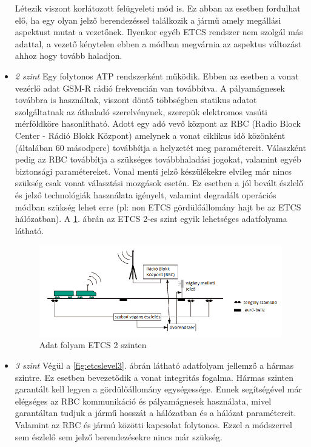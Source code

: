 \documentclass[a4paper,12pt]{article}
\begin{document}
\begin{itemize}
	Létezik viszont korlátozott felügyeleti mód is. Ez abban az esetben fordulhat elő, ha egy olyan jelző berendezéssel találkozik a jármű amely megállási aspektust mutat a vezetőnek.
	Ilyenkor egyéb ETCS rendszer nem szolgál más adattal, a vezető kénytelen ebben a módban megvárnia az aspektus változást ahhoz hogy tovább haladjon.
	
	\item \textit{2 szint} Egy folytonos ATP rendszerként működik. Ebben az esetben a vonat vezérlő adat GSM-R rádió frekvencián van továbbítva.
	A pályamágnesek továbbra is használtak, viszont döntő többségben statikus adatot szolgáltatnak az áthaladó szerelvénynek, szerepük elektromos vasúti mérföldköre hasonlítható.
	Adott egy adó vevő központ az RBC (Radio Block Center - Rádió Blokk Központ) amelynek a vonat ciklikus idő közönként (általában 60 másodperc) továbbítja a helyzetét meg paramétereit. 
	Válaszként pedig az RBC továbbítja a szükséges továbbhaladási jogokat, valamint egyéb biztonsági paramétereket.
	Vonal menti jelző készülékekre elvileg már nincs szükség csak vonat választási mozgások esetén. 
	Ez esetben a jól bevált észlelő és jelző technológiák használata igényelt, valamint degradált operációs módban szükség lehet erre (pl: non ETCS gördülőállomány hajt be az ETCS hálózatban).
	A \ref{fig:etcslevel2}. ábrán az ETCS 2-es szint egyik lehetséges adatfolyama látható. 
	
	\begin{figure}[htp]
	    \centering
	    \includegraphics[width=\linewidth]{images/etcs_level_2.png}
	    \caption[ETCS 2]{Adat folyam ETCS 2 szinten}
	    \label{fig:etcslevel2}
    \end{figure}
    
	\item \textit{3 szint} Végül a \ref{fig:etcslevel3}. ábrán látható adatfolyam jellemző a hármas szintre. Ez esetben bevezetődik a vonat integritás fogalma.
	Hármas szinten garantált kell legyen a gördülőállomány egységessége. 
	Ennek segítségével már elégséges az RBC kommunikáció és pályamágnesek használata, mivel garantáltan tudjuk a jármű hosszát a hálózatban és a hálózat paramétereit.
	Valamint az RBC és jármú közötti kapcsolat folytonos. Ezzel a módszerrel sem észlelő sem jelző berendezésekre nincs már szükség. 
	

\end{itemize}
\end{document}
